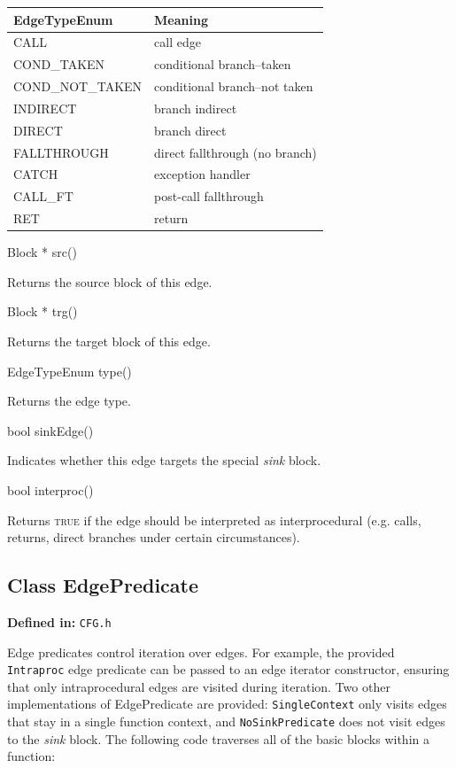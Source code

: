 \documentclass{article}
\newenvironment{apient}{\small\verbatim}{\endverbatim}
\newcommand{\apidesc}[1]{%
{\addtolength{\leftskip}{4em}%
#1\par\medskip}
}
\newcommand{\definedin}[1]{%
\textbf{Defined in:} \texttt{#1}
}
\begin{document}
\begin{center}
\begin{tabular}{ll}
\toprule
EdgeTypeEnum & Meaning \\
\midrule
CALL & call edge \\
COND\_TAKEN & conditional branch--taken \\
COND\_NOT\_TAKEN & conditional branch--not taken \\
INDIRECT & branch indirect \\
DIRECT & branch direct \\
FALLTHROUGH & direct fallthrough (no branch) \\
CATCH & exception handler \\
CALL\_FT & post-call fallthrough \\
RET & return \\
\bottomrule
\end{tabular}
\end{center}

\begin{apient}
Block * src()
\end{apient}
\apidesc{Returns the source block of this edge.}

\begin{apient}
Block * trg()
\end{apient}
\apidesc{Returns the target block of this edge.}

\begin{apient}
EdgeTypeEnum type()
\end{apient}
\apidesc{Returns the edge type.}

\begin{apient}
bool sinkEdge()
\end{apient}
\apidesc{Indicates whether this edge targets the special \emph{sink} block.}

\begin{apient}
bool interproc()
\end{apient}
\apidesc{Returns {\scshape true} if the edge should be interpreted as interprocedural (e.g. calls, returns, direct branches under certain circumstances).}

\subsection{Class EdgePredicate}
\label{sec:pred}

\definedin{CFG.h}

Edge predicates control iteration over edges. For example, the provided
\texttt{Intraproc} edge predicate can be passed to an edge iterator
constructor, ensuring that only intraprocedural edges are visited during
iteration. Two other implementations of EdgePredicate are provided: 
\texttt{SingleContext} only visits edges that stay in a single
function context, and \texttt{NoSinkPredicate} does not visit edges to 
the \emph{sink} block.  The following code traverses 
all of the basic blocks within a
function:
\end{document}
